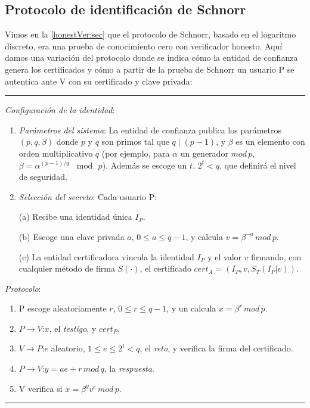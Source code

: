 

\subsection{Protocolo de identificación de Schnorr}

Vimos en la \autoref{honestVer:sec} que el protocolo de Schnorr, basado en el logaritmo discreto, era una prueba de conocimiento cero con verificador honesto. Aquí damos una variación del protocolo donde se indica cómo la entidad de confianza genera los certificados y cómo a partir de la prueba de Schnorr un usuario P se autentica ante V con su certificado y clave privada: 


\rule{\textwidth}{1pt}
\begin{algorithm}
	\hfil
	
	\textit{Configuración de la identidad}:
	\begin{enumerate}
		\item \textit{Parámetros del sistema}: La entidad de confianza publica los parámetros $(p,q,\beta)$ donde $p$ y $q$ son primos tal que $q\mid (p-1)$, y $\beta$ es un elemento con orden multiplicativo $q$ (por ejemplo, para $\alpha$ un generador $mod\,p$, $\beta=\alpha^{(p-1)/q}\,\mod\,p$). Además se escoge un $t$, $2^t < q$, que definirá el nivel de seguridad.
		
				
		\item \textit{Selección del secreto}: Cada usuario P:
		
		\subitem (a) Recibe una identidad única $I_P$.
		
		\subitem (b) Escoge una clave privada $a$, $0\leq a \leq q-1$, y calcula $v = \beta^{-a}\, mod\, p$.
		
		\subitem (c) La entidad certificadora vincula la identidad $I_P$ y el valor $v$ firmando, con cualquier método de firma $S(\cdot)$, el certificado $cert_A = (I_P, v, S_T(I_P|v))$.
		
	\end{enumerate}
	
	
	\textit{Protocolo}:
	\begin{enumerate}
		\item P escoge aleatoriamente $r$, $0\leq r\leq q-1$, y un calcula $x=\beta^r\,mod\,p$.
		\item $P \rightarrow V$:\quad $x$, el \textit{testigo}, y $cert_P$.
		\item $V \rightarrow P$:\quad $e$ aleatorio, $1\leq e\leq 2^t<q$, el \textit{reto}, y verifica la firma del certificado.
		\item $P \rightarrow V$:\quad $y=ae+r\, mod\, q$, la \textit{respuesta}.
		\item V verifica si \quad $ x = \beta^y v^e \, mod \, p$.
	\end{enumerate}
	
\end{algorithm}
\rule{\textwidth}{1pt}

